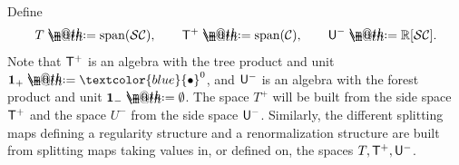 \documentclass[10pt, reqno]{amsart}
\makeatletter
\numberwithin{subsection}{section}
\numberwithin{subsubsection}{subsection}
\numberwithin{equation}{section} %
\theoremstyle{mystyle}
\theoremstyle{mystyle2}
\theoremstyle{mystyle3}
\newcommand\bbR{\mathbb{R}}
\newcommand*{\defeq}{\mathrel{\rlap{%
                     \raisebox{0.3ex}{$\m@th\cdot$}}%
                     \raisebox{-0.3ex}{$\m@th\cdot$}}%
                     =}
\makeatother
\begin{document}
\medskip

Define
$$
T \defeq  \text{\rm span}(\mathcal{SC}),   \qquad
{\sf T}^+ \defeq  \text{\rm span}(\mathcal{C}),   \qquad
{\sf U}^- \defeq  \bbR[\mathcal{SC}].
$$
Note that ${\sf T}^+$ is an algebra with the tree product and unit ${\bf1}_+ \defeq  \textcolor{blue}{\bullet}^0$, and ${\sf U}^-$ is an algebra with 
the forest product and unit ${\bf1}_-\defeq \emptyset$. The space $T^+$ will 
be built from the side space ${\sf T}^+$ and the space $U^-$ from the side space ${\sf U}^-$. Similarly, the different splitting maps defining a regularity structure and a renormalization structure are built from splitting maps taking values in, or defined on, the spaces $T,{\sf T}^+, {\sf U}^-$.

\medskip
\end{document}
